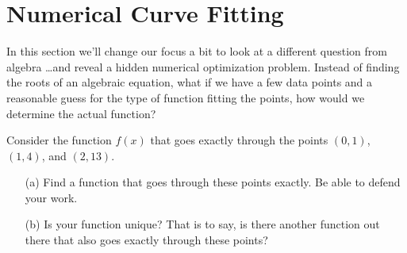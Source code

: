 \newpage\section{Numerical Curve Fitting}
In this section we'll change our focus a bit to look at a different question from algebra
\ldots and reveal a hidden numerical optimization problem.
Instead of finding the roots of an algebraic equation, what if we have a few data points
and a reasonable guess for the type of function fitting the points, how would we determine
the actual function?  

\begin{problem}
    Consider the function $f(x)$ that goes exactly through the points $(0,1)$, $(1,4)$,
    and $(2,13)$.  
    \begin{enumerate}
        \item[(a)] Find a function that goes through these points exactly.  Be able to
            defend your work.
        \item[(b)] Is your function unique?  That is to say, is there another function out
            there that also goes exactly through these points?  
    \end{enumerate}
\end{problem}

